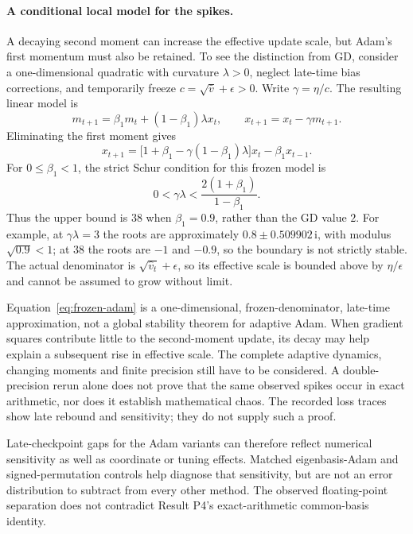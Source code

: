 \documentclass[11pt,a4paper]{article}
\begin{document}
\paragraph{A conditional local model for the spikes.} A decaying second
moment can increase the effective update scale, but Adam's first momentum
must also be retained. To see the distinction from GD, consider a
one-dimensional quadratic with curvature $\lambda>0$, neglect late-time bias
corrections, and temporarily freeze
$c=\sqrt{\bar v}+\epsilon>0$. Write $\gamma=\eta/c$. The resulting linear model is
\[
 m_{t+1}=\beta_1m_t+(1-\beta_1)\lambda x_t,\qquad
 x_{t+1}=x_t-\gamma m_{t+1}.
\]
Eliminating the first moment gives
\begin{equation}
 x_{t+1}=\bigl[1+\beta_1-\gamma(1-\beta_1)\lambda\bigr]x_t
          -\beta_1x_{t-1}.
\end{equation}
For $0\leq\beta_1<1$, the strict Schur condition for this frozen model is
\begin{equation}
 0<\gamma\lambda<\frac{2(1+\beta_1)}{1-\beta_1}.
 \label{eq:frozen-adam}
\end{equation}
Thus the upper bound is $38$ when $\beta_1=0.9$, rather than the GD value $2$.
For example, at $\gamma\lambda=3$ the roots are approximately
$0.8\pm0.509902\,\mathrm{i}$, with modulus $\sqrt{0.9}<1$;
at $38$ the roots are $-1$ and $-0.9$, so the boundary is not strictly stable.
The actual denominator is $\sqrt{\hat v_t}+\epsilon$, so its effective scale
is bounded above by $\eta/\epsilon$ and cannot be assumed to grow without limit.

Equation~\eqref{eq:frozen-adam} is a one-dimensional, frozen-denominator,
late-time approximation, not a global stability theorem for adaptive Adam.
When gradient squares contribute little to the second-moment update, its
decay may help explain a subsequent rise in effective scale. The complete
adaptive dynamics, changing moments and finite precision still have to be
considered. A double-precision rerun alone does not prove that the same
observed spikes occur in exact arithmetic, nor does it establish mathematical
chaos. The recorded loss traces show late rebound and sensitivity; they do not
supply such a proof.

Late-checkpoint gaps for the Adam variants can therefore reflect numerical
sensitivity as well as coordinate or tuning effects. Matched eigenbasis-Adam
and signed-permutation controls help diagnose that sensitivity, but are not
an error distribution to subtract from every other method. The observed
floating-point separation does not contradict Result P4's exact-arithmetic
common-basis identity.
\end{document}
